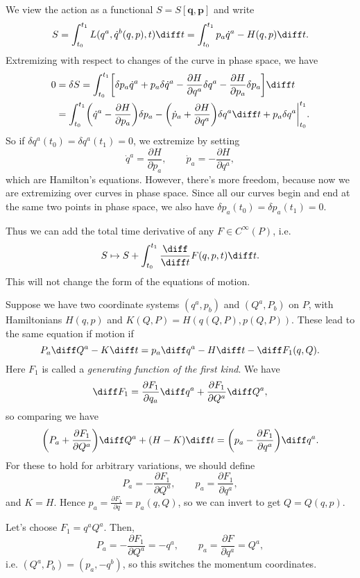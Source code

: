 \documentclass[12pt]{article}
\begin{document}
We view the action as a functional $S = S[\mathbf{q}, \mathbf{p}]$ and write
\[
S = \int_{t_0}^{t_1} L(q^a, \dot q^b(q, p), t) \diff t= \int_{t_0}^{t_1} p_a \dot q^a - H(q, p) \diff t.
\]
Extremizing with respect to changes of the curve in phase space, we have
\begin{align*}
	0 &= \delta S = \int_{t_0}^{t_1} \biggl[ \delta p_a \dot q^a + p_a \delta \dot q^a - \frac{\partial H}{\partial q^a} \delta q^a - \frac{\partial H}{\partial p_a} \delta p_a \biggr] \diff t\\
	  &= \int_{t_0}^{t_1} \biggl( \dot q^a - \frac{\partial H}{\partial p_a} \biggr) \delta p_a - \biggl( \dot p_a + \frac{\partial H}{\partial q^a} \biggr) \delta q^a \diff t + p_a \delta q^a \biggr|_{t_0}^{t_1}.
\end{align*}
So if $\delta q^a(t_0)=  \delta q^a(t_1) = 0$, we extremize by setting
\[
\dot q^a = \frac{\partial H}{\partial p_a}, \qquad \dot p_a = - \frac{\partial H}{\partial q^a},
\]
which are Hamilton's equations. However, there's more freedom, because now we are extremizing over curves in phase space. Since all our curves begin and end at the same two points in phase space, we also have $\delta p_a(t_0) = \delta p_a(t_1) = 0$.

Thus we can add the total time derivative of any $F \in C^{\infty}(P)$, i.e.
\[
	S \mapsto S + \int_{t_0}^{t_1} \frac{\diff}{\diff t}F(q, p, t) \diff t.
\]
This will not change the form of the equations of motion.

Suppose we have two coordinate systems $(q^a, p_b)$ and $(Q^a, P_b)$ on $P$, with Hamiltonians $H(q, p)$ and $K(Q, P) = H(q(Q,P), p(Q, P))$. These lead to the same equation if motion if
\[
P_a \diff Q^a - K \diff t = p_a \diff q^a - H \diff t - \diff F_1(q, Q).
\]
Here $F_1$ is called a \emph{generating function of the first kind}. We have
\[
	\diff F_1 = \frac{\partial F_1}{\partial q_a} \diff q^a + \frac{\partial F_1}{\partial Q^a} \diff Q^a,
\]
so comparing we have
\[
	\biggl( P_a + \frac{\partial F_1}{\partial Q^a} \biggr) \diff Q^a + (H-K) \diff t = \biggl( p_a - \frac{\partial F_1}{ \partial q^a} \biggr) \diff q^a.
\]
For these to hold for arbitrary variations, we should define
\[
P_a = - \frac{\partial F_1}{\partial Q^a}, \qquad p_a = \frac{\partial F_1}{\partial q^a},
\]
and $K = H$. Hence $p_a = \frac{\partial F_1}{\partial q} = p_a(q, Q)$, so we can invert to get $Q = Q(q,p)$.


\begin{exbox}
	Let's choose $F_1 = q^aQ^a$. Then,
	\[
	P_a = - \frac{\partial F_1}{\partial Q^a} = -q^a, \qquad p_a = \frac{\partial F}{\partial q^a} = Q^a,
	\]
	i.e. $(Q^a, P_b) = (p_a, -q^b)$, so this switches the momentum coordinates.
\end{exbox}
\end{document}
